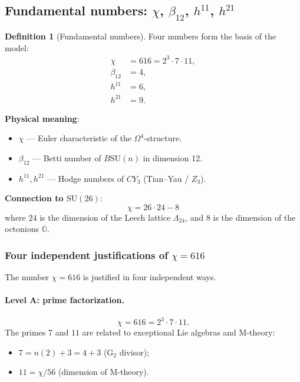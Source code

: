 \documentclass[11pt,a4paper]{article}
\newcommand{\SU}{\ensuremath{\mathrm{SU}}}
\newcommand{\CY}{\ensuremath{CY_3}}
\newcommand{\Om}{\ensuremath{\Omega^4}}
\theoremstyle{definition}
\newtheorem{definition}[theorem]{Definition}
\begin{document}
\subsection{Fundamental numbers: \texorpdfstring{$\chi$, $\beta_{12}$, $h^{11}$, $h^{21}$}{chi, beta12, h11, h21}}
\label{subsec:fundamental-numbers}

\begin{definition}[Fundamental numbers]
\label{def:fundamental-numbers}
Four numbers form the basis of the model:
\begin{align}
    \chi &= 616 = 2^3 \cdot 7 \cdot 11, \\
    \beta_{12} &= 4, \\
    h^{11} &= 6, \\
    h^{21} &= 9.
\end{align}
\end{definition}

\textbf{Physical meaning}:
\begin{itemize}
    \item $\chi$ --- Euler characteristic of the $\Om$-structure.
    \item $\beta_{12}$ --- Betti number of $B\SU(n)$ in dimension 12.
    \item $h^{11}, h^{21}$ --- Hodge numbers of $\CY$ (Tian--Yau / $Z_3$).
\end{itemize}

\textbf{Connection to $\SU(26)$}:
\begin{equation}
    \chi = 26 \cdot 24 - 8
    \label{eq:chi-leech}
\end{equation}
where $24$ is the dimension of the Leech lattice $\Lambda_{24}$,
and $8$ is the dimension of the octonions $\mathbb{O}$.

\subsubsection{Four independent justifications of \texorpdfstring{$\chi = 616$}{ = 616}}
\label{subsubsec:chi-justification}

The number $\chi = 616$ is justified in four independent ways.

\paragraph{Level A: prime factorization.}
\begin{equation}
    \chi = 616 = 2^3 \cdot 7 \cdot 11.
\end{equation}
The primes $7$ and $11$ are related to exceptional Lie algebras
and M-theory:
\begin{itemize}
    \item $7 = n(2) + 3 = 4 + 3$ (G$_2$ divisor);
    \item $11 = \chi/56$ (dimension of M-theory).
\end{itemize}
\end{document}
